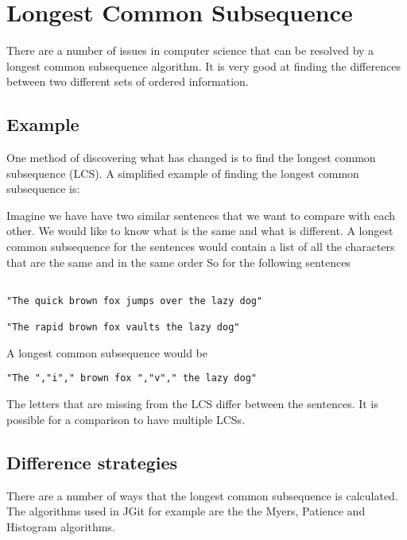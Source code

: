 \section{Longest Common Subsequence}
There are a number of issues in computer science that can be resolved by a longest common subsequence algorithm.
It is very good at finding the differences between two different sets of ordered information.


\subsection{Example}
One method of discovering what has changed is to find the longest common subsequence (LCS).
A simplified example of finding the longest common subsequence is:

Imagine we have have two similar sentences that we want to compare with each other.  
We would like to know what is the same and what is different.
A longest common subsequence for the sentences would contain a list of all the characters that are the same and in the same order
So for the following sentences

\begin{verbatim}

"The quick brown fox jumps over the lazy dog"

"The rapid brown fox vaults the lazy dog"

\end{verbatim}
A longest common subsequence would be
\begin{verbatim}
"The ","i"," brown fox ","v"," the lazy dog"
\end{verbatim}
The letters that are missing from the LCS differ between the sentences.
It is possible for a comparison to have multiple LCSs.

\subsection{Difference strategies}
There are a number of ways that the longest common subsequence is calculated. The algorithms used in JGit for example are the the Myers, Patience and Histogram algorithms.

